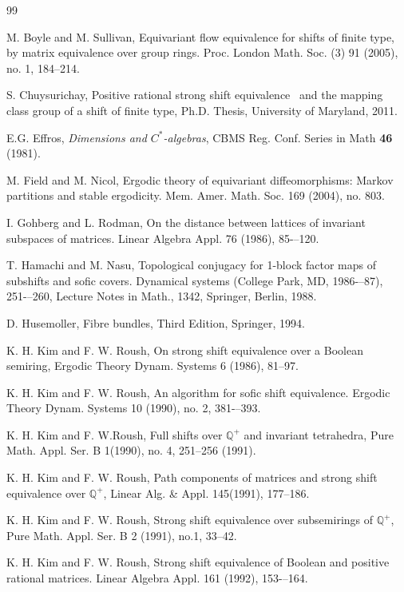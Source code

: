 \documentclass{amsart}
\theoremstyle{definition}
\theoremstyle{remark}
\numberwithin{equation}{section}
\begin{document}
{{\begin{thebibliography}{99}

M. Boyle and M.  Sullivan, 
Equivariant flow equivalence for shifts of finite type, 
by matrix equivalence over group rings.
Proc. London Math. Soc. (3) 91 (2005), no. 1, 184--214.


 S. Chuysurichay, Positive rational strong shift equivalence \
and the mapping class group of a shift of finite type, Ph.D. Thesis, 
University of Maryland, 2011. 


 E.G. Effros, 
	{\em Dimensions and $C^*$-algebras}, 
	CBMS Reg. Conf. Series in Math {\bf  46} (1981).

 M. Field and M. Nicol, 
Ergodic theory of equivariant diffeomorphisms: 
Markov partitions and stable ergodicity. Mem. Amer. Math. Soc. 169 
(2004), no. 803. 

 I. Gohberg and L. Rodman, 
On the distance between lattices of invariant subspaces of matrices.
Linear Algebra Appl. 76 (1986), 85-–120. 

T. Hamachi and M. Nasu, 
Topological conjugacy for 1-block factor maps 
of subshifts and sofic covers. Dynamical systems (College Park, MD, 1986-–87),
 251-–260,
Lecture Notes in Math., 1342, Springer, Berlin, 1988. 

 D. Husemoller, Fibre bundles, Third Edition, Springer, 1994.

 K. H. Kim and F. W. Roush, 
On strong shift equivalence over a Boolean semiring, Ergodic Theory 
Dynam. Systems 6 (1986), 81--97.

 K. H. Kim and F. W. Roush, 
An algorithm for sofic shift equivalence.
Ergodic Theory Dynam. Systems 10 (1990), no. 2, 381-–393. 

 K. H. Kim and F. W.Roush,
 Full shifts over $\mathbb Q^+$ and invariant tetrahedra, 
Pure Math. Appl. Ser. B 1(1990), no. 4, 251--256 (1991). 

K. H. Kim and F. W. Roush, Path components of matrices and strong shift equivalence over 
$\mathbb Q^+$, Linear Alg. \& Appl. 145(1991), 177--186.

 K. H. Kim and F. W. Roush, 
Strong shift equivalence over subsemirings of $\mathbb Q^+$, 
Pure Math. Appl. Ser. B 2 (1991), no.1, 33--42.

 K. H. Kim and F. W. Roush, 
Strong shift equivalence of Boolean and positive rational matrices.
Linear Algebra Appl. 161 (1992), 153-–164. 


\end{thebibliography}}}
\end{document}
